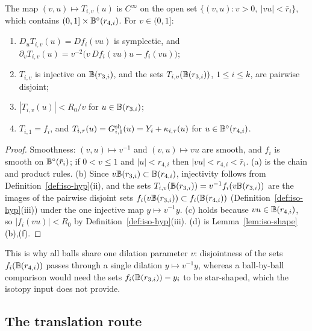\begin{lemma}\label{lem:iso-tail}
The map $(v,u)\mapsto T_{i,v}(u)$ is $C^\infty$ on the open set $\{(v,u):v>0,\ |vu|<\bar r_i\}$, which contains
$(0,1]\times\mathbb{B}^\circ(r_{4,i})$. For $v\in(0,1]$:
\begin{enumerate}[label=(\alph*)]
\item $D_uT_{i,v}(u)=Df_i(vu)$ is symplectic, and
 $\partial_vT_{i,v}(u)=v^{-2}\big(v\,Df_i(vu)u-f_i(vu)\big)$;
\item $T_{i,v}$ is injective on $\mathbb{B}(r_{3,i})$, and the sets $T_{i,v}(\mathbb{B}(r_{3,i}))$, $1\le i\le k$, are pairwise
 disjoint;
\item $|T_{i,v}(u)|<R_0/v$ for $u\in\mathbb{B}(r_{3,i})$;
\item $T_{i,1}=f_i$, and $T_{i,\tau}(u)=G^{\rm sh}_{i,1}(u)=Y_i+\kappa_{i,\tau}(u)$ for $u\in\mathbb{B}^\circ(r_{4,i})$.
\end{enumerate}
\end{lemma}

\begin{proof}
Smoothness: $(v,u)\mapsto v^{-1}$ and $(v,u)\mapsto vu$ are smooth, and $f_i$ is smooth on $\mathbb{B}^\circ(\bar r_i)$; if $0<v\le1$
and $|u|<r_{4,i}$ then $|vu|<r_{4,i}<\bar r_i$. (a) is the chain and product rules. (b) Since
$v\mathbb{B}(r_{3,i})\subset\mathbb{B}(r_{4,i})$, injectivity follows from Definition~\ref{def:iso-hyp}(ii), and the sets
$T_{i,v}(\mathbb{B}(r_{3,i}))=v^{-1}f_i(v\mathbb{B}(r_{3,i}))$ are the images of the pairwise disjoint sets
$f_i(v\mathbb{B}(r_{3,i}))\subset f_i(\mathbb{B}(r_{4,i}))$ (Definition~\ref{def:iso-hyp}(iii)) under the one injective map $y\mapsto v^{-1}y$.
(c) holds because $vu\in\mathbb{B}(r_{4,i})$, so $|f_i(vu)|<R_0$ by Definition~\ref{def:iso-hyp}(iii). (d) is
Lemma~\ref{lem:iso-shape}(b),(f).
\end{proof}

This is why all balls share one dilation parameter $v$: disjointness of the sets $f_i(\mathbb{B}(r_{4,i}))$ passes through a
single dilation $y\mapsto v^{-1}y$, whereas a ball-by-ball comparison would need the sets $f_i(\mathbb{B}(r_{3,i}))-y_i$ to be
star-shaped, which the isotopy input does not provide.

\subsection{The translation route}\label{sec:iso-route}

